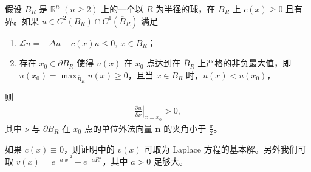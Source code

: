 \documentclass[../../main.tex]{subfiles}%
\begin{document}
\begin{theorem}[Hopf(霍夫)引理]\label{theorem:Hopf引理}
假设 $B_R$ 是 $\mathbb{R}^n$ $(n\geqslant 2)$ 上的一个以 $R$ 为半径的球，在 $B_R$ 上 $c(x)\geqslant 0$ 且有界。如果 $u\in C^2(B_R)\cap C^1(\overline{B}_R)$ 满足
\begin{enumerate}[(1)]
\item $\mathcal{L}u = -\Delta u + c(x)u \leqslant 0,\ x\in B_R$；
\item 存在 $x_0\in\partial B_R$ 使得 $u(x)$ 在 $x_0$ 点达到在 $\overline{B}_R$ 上严格的非负最大值，即 $u(x_0)=\max_{\overline{B}_R}u(x)\geqslant 0$，且当 $x\in B_R$ 时，$u(x)<u(x_0)$，
\end{enumerate}
则
\begin{align}
\left.\frac{\partial u}{\partial \nu}\right|_{x=x_0} > 0, \label{eq:hoph-deriv}
\end{align}
其中 $\nu$ 与 $\partial B_R$ 在 $x_0$ 点的单位外法向量 $\bm{n}$ 的夹角小于 $\frac{\pi}{2}$。
\end{theorem}
\begin{remark}
如果 $c(x)\equiv 0$，则证明中的 $v(x)$ 可取为 Laplace 方程的基本解。另外我们可取 $v(x)=e^{-a|x|^2}-e^{-aR^2}$，其中 $a>0$ 足够大。
\end{remark}
\end{document}
